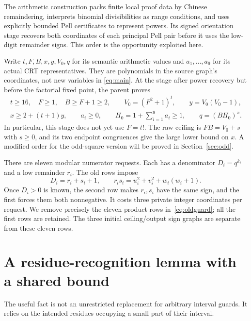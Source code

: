 \documentclass[11pt]{article}
\begin{document}
The arithmetic construction packs finite local proof data by Chinese
remaindering, interprets binomial divisibilities as range conditions, and
uses explicitly bounded Pell certificates to represent powers. Its
signed orientation stage recovers both coordinates of each principal
Pell pair before it uses the low-digit remainder signs. This order is
the opportunity exploited here.

Write $t,F,B,x,y,V_0,q$ for its semantic arithmetic values and
$a_1,\ldots,a_9$ for its actual CRT representatives. They are polynomials
in the source graph's coordinates, not new variables in
\eqref{eq:main}. At the stage after power recovery but before the
factorial fixed point, the parent proves
\begin{gather}
 t\ge16,\quad F\ge1,\quad B\ge F+1\ge2,\qquad
 V_0=(F^2+1)^t,\qquad y=V_0(V_0-1),\label{eq:raw1}\\
 x\ge2+(t+1)y,\qquad a_i\ge0,\qquad
 H_0=1+\sum_{i=1}^9a_i\ge1,\qquad q=(BH_0)^x.
 \label{eq:raw2}
\end{gather}
In particular, this stage does not yet use $F=t!$. The raw ceiling is
$FB=V_0+s$ with $s\ge0$, and its two endpoint congruences give the large
lower bound on $x$. A modified order for the odd-square version will be
proved in Section~\ref{sec:odd}.

There are eleven modular numerator requests. Each has a denominator
$D_i=q^{k_i}$ and a low remainder $r_i$. The old rows impose
\begin{equation}
 D_i=r_i+s_i+1,\qquad
 r_is_i=u_i^2+v_i^2+w_i(w_i+1).
 \label{eq:oldguard}
\end{equation}
Once $D_i>0$ is known, the second row makes $r_i,s_i$ have the same sign,
and the first forces them both nonnegative. It costs three private integer
coordinates per request. We remove precisely the eleven product rows
in~\eqref{eq:oldguard}; all the first rows are retained. The three initial
ceiling/output sign graphs are separate from these eleven rows.

\section{A residue-recognition lemma with a shared bound}

The useful fact is not an unrestricted replacement for arbitrary interval
guards. It relies on the intended residues occupying a small part of their
interval.
\end{document}
